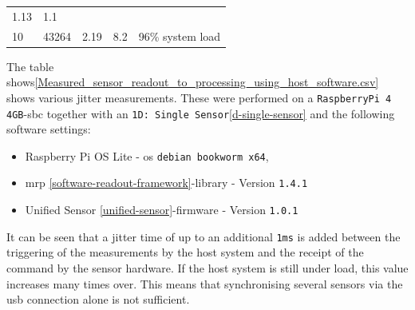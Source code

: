 \begin{longtable}[]{@{}lllll@{}}
\begin{minipage}[t]{0.35\columnwidth}
1.13\strut
\end{minipage} & \begin{minipage}[t]{0.22\columnwidth}\raggedright
1.1\strut
\end{minipage} & \begin{minipage}[t]{0.10\columnwidth}\raggedright
\strut
\end{minipage}\tabularnewline
\begin{minipage}[t]{0.08\columnwidth}\raggedright
10\strut
\end{minipage} & \begin{minipage}[t]{0.11\columnwidth}\raggedright
43264\strut
\end{minipage} & \begin{minipage}[t]{0.35\columnwidth}\raggedright
2.19\strut
\end{minipage} & \begin{minipage}[t]{0.22\columnwidth}\raggedright
8.2\strut
\end{minipage} & \begin{minipage}[t]{0.10\columnwidth}\raggedright
96\% system load\strut
\end{minipage}\tabularnewline
\bottomrule
\end{longtable}

The table
shows\ref{Measured_sensor_readout_to_processing_using_host_software.csv}
shows various jitter measurements. These were performed on a
\passthrough{\lstinline!RaspberryPi 4 4GB!}-\gls{sbc} together with an
\passthrough{\lstinline!1D: Single Sensor!}\ref{d-single-sensor} and the
following software settings:

\begin{itemize}
\tightlist
\item
  Raspberry Pi OS Lite - \gls{os}
  \passthrough{\lstinline!debian bookworm x64!},
\item
  \gls{mrp} \ref{software-readout-framework}-library - Version
  \passthrough{\lstinline!1.4.1!}
\item
  Unified Sensor \ref{unified-sensor}-firmware - Version
  \passthrough{\lstinline!1.0.1!}
\end{itemize}

It can be seen that a jitter time of up to an additional
\passthrough{\lstinline!1ms!} is added between the triggering of the
measurements by the host system and the receipt of the command by the
sensor hardware. If the host system is still under load, this value
increases many times over. This means that synchronising several sensors
via the \gls{usb} connection alone is not sufficient.

